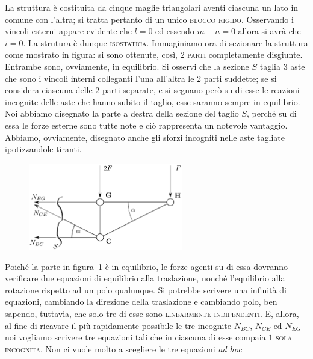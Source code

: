 La struttura è costituita da cinque maglie triangolari aventi ciascuna un lato in comune con l'altra; si tratta pertanto di un unico \textsc{blocco rigido}. Osservando i vincoli esterni appare evidente che $l=0$ ed essendo $m-n=0$ allora si avrà che $i=0$. La strutura è dunque \textsc{isostatica}. Immaginiamo ora di sezionare la struttura come mostrato in figura: si sono ottenute, così, $2$ \textsc{parti} completamente disgiunte. Entrambe sono, ovviamente, in equilibrio. Si osservi che la sezione $S$ taglia $3$ aste che sono i vincoli interni colleganti l'una all'altra le $2$ parti suddette; se si considera ciascuna delle $2$ parti separate, e si segnano però su di esse le reazioni incognite delle aste che hanno subito il taglio, esse saranno sempre in equilibrio. Noi abbiamo disegnato la parte a destra della sezione del taglio $S$, perché su di essa le forze esterne sono tutte note e ciò rappresenta un notevole vantaggio. Abbiamo, ovviamente, disegnato anche gli sforzi incogniti nelle aste tagliate ipotizzandole tiranti.
\renewcommand{\thefigure}{9~-~2}
\begin{figure}[ht]
\centering
\includegraphics[width=0.6\textwidth]{Immagini/Parte_9/Figura9_2/Figura9_2.pdf}
\caption{}
\label{figura9-2}
\end{figure}
Poiché la parte in figura~\ref{figura9-2} è in equilibrio, le forze agenti su di essa dovranno verificare due equazioni di equilibrio alla traslazione, nonché l'equilibrio alla rotazione rispetto ad un polo qualunque. Si potrebbe scrivere una infinità di equazioni, cambiando la direzione della traslazione e cambiando polo, ben sapendo, tuttavia, che solo tre di esse sono \textsc{linearmente indipendenti}. E, allora, al fine di ricavare il più rapidamente possibile le tre incognite $N_{BC}$, $N_{CE}$ ed $N_{EG}$ noi vogliamo scrivere tre equazioni tali che in ciascuna di esse compaia $1$ \textsc{sola incognita}. Non ci vuole molto a scegliere le tre equazioni \emph{ad hoc}

